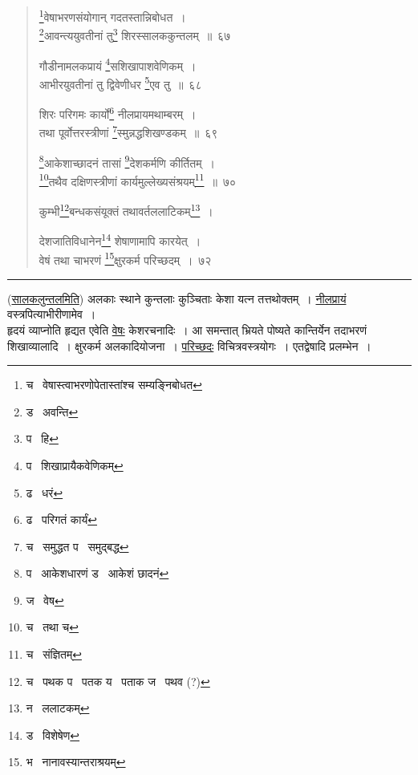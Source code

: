 \documentclass[11pt, openany]{book}
\begin{document}
\begin{quote}
{\na \renewcommand{\thefootnote}{1}\footnote{च \textendash\ वेषास्त्वाभरणोपेतास्तांश्च सम्यङ्निबोधत}वेषाभरणसंयोगान् गदतस्तान्निबोधत~।\\
\renewcommand{\thefootnote}{2}\footnote{ड \textendash\ अवन्ति}आवन्त्ययुवतीनां तु\renewcommand{\thefootnote}{3}\footnote{प \textendash\ हि} शिरस्सालककुन्तलम्~॥~६७

गौडीनामलकप्रायं \renewcommand{\thefootnote}{4}\footnote{प \textendash\ शिखाप्रायैकवेणिकम्}सशिखापाशवेणिकम्~।\\
आभीरयुवतीनां तु द्विवेणीधर \renewcommand{\thefootnote}{5}\footnote{ढ \textendash\ धरं}एव तु~॥~६८

शिरः परिगमः कार्यो\renewcommand{\thefootnote}{6}\footnote{ढ \textendash\ परिगतं कार्यं} नीलप्रायमथाम्बरम्~।\\
तथा पूर्वोत्तरस्त्रीणां \renewcommand{\thefootnote}{7}\footnote{च \textendash\ समुद्धत प \textendash\ समुद्बद्ध}स्मुन्नद्धशिखण्डकम्~॥~६९

\renewcommand{\thefootnote}{8}\footnote{प \textendash\ आकेशधारणं ड \textendash\ आकेशं छादनं}आकेशाच्छादनं तासां \renewcommand{\thefootnote}{9}\footnote{ज \textendash\ वेष}देशकर्मणि कीर्तितम्~।\\
\renewcommand{\thefootnote}{10}\footnote{च \textendash\ तथा च}तथैव दक्षिणस्त्रीणां कार्यमुल्लेख्यसंश्रयम्\renewcommand{\thefootnote}{11}\footnote{च \textendash\ संज्ञितम्}~॥~७०

कुम्भी\renewcommand{\thefootnote}{12}\footnote{च \textendash\ पथक प \textendash\ पतक य \textendash\ पताक ज \textendash\ पथव (?)}बन्धकसंयूक्तं तथावर्तललाटिकम्\renewcommand{\thefootnote}{13}\footnote{न \textendash\ ललाटकम्}~।

देशजातिविधानेन\renewcommand{\thefootnote}{14}\footnote{ड \textendash\ विशेषेण} शेषाणामापि कारयेत्~।\\
वेषं तथा चाभरणं \renewcommand{\thefootnote}{15}\footnote{भ \textendash\ नानावस्यान्तराश्रयम्}क्षुरकर्म परिच्छदम्~।~७२}
\end{quote}

\hrule

\vspace{2mm}
(\underline{सालकलुन्तलमिति}) अलकाः स्थाने कुन्तलाः कुञ्चिताः केशा यत्न तत्तथोक्तम्~। \underline{नीलप्रायं} वस्त्रपित्याभीरीणामेव~।\\

हृदयं व्याप्नोति हृद्यत एवेति \underline{वेषः} केशरचनादिः~। आ समन्तात् भ्रियते पोष्यते कान्तिर्येन तदाभरणं शिखाव्यालादि~। क्षुरकर्म अलकादियोजना~। \underline{परिच्छदः} विचित्रवस्त्रयोगः~। एतद्वेषादि प्रलम्भेन~।
\end{document}

